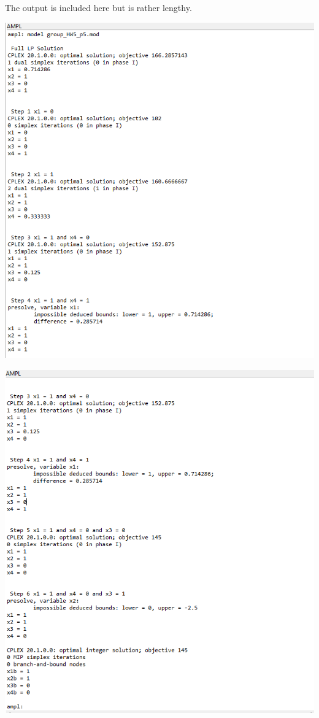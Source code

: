 \documentclass[11pt]{article}
\begin{document}
\begin{enumerate}
{\tiny {}}
The output is included here but is rather lengthy.

\includegraphics[width = .9\textwidth]{outputp5.png}

\includegraphics[width = .9\textwidth]{outputp5a.png}
\end{enumerate}
\end{document}
